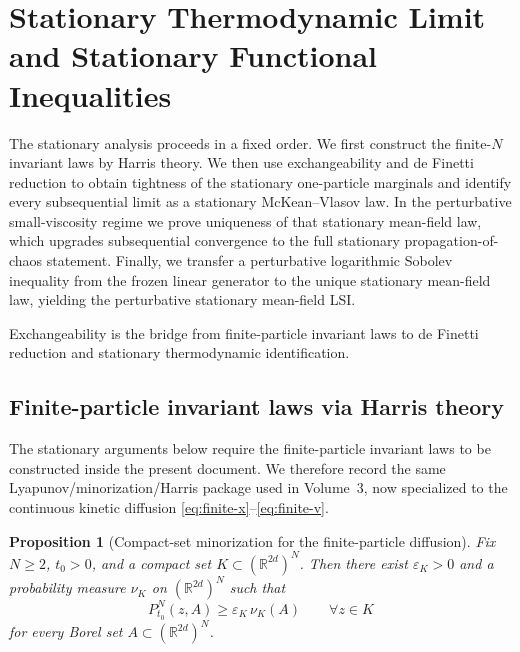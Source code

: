 \documentclass[11pt]{article}
\newtheorem{proposition}[theorem]{Proposition}
\theoremstyle{definition}
\theoremstyle{remark}
\newcommand{\R}{\mathbb{R}}
\begin{document}
\section{Stationary Thermodynamic Limit and Stationary Functional Inequalities}

The stationary analysis proceeds in a fixed order. We first construct the
finite-$N$ invariant laws by Harris theory. We then use exchangeability and
de Finetti reduction to obtain tightness of the stationary one-particle
marginals and identify every subsequential limit as a stationary
McKean--Vlasov law. In the perturbative small-viscosity regime we prove uniqueness of that
stationary mean-field law, which upgrades subsequential convergence to the full
stationary propagation-of-chaos statement. Finally, we transfer a perturbative
logarithmic Sobolev inequality from the frozen linear generator to the unique
stationary mean-field law, yielding the perturbative stationary mean-field LSI.

Exchangeability is the bridge from finite-particle invariant laws to de Finetti
reduction and stationary thermodynamic identification.

\subsection{Finite-particle invariant laws via Harris theory}

The stationary arguments below require the finite-particle invariant laws to be
constructed inside the present document. We therefore record the same
Lyapunov/minorization/Harris package used in Volume~3,
now specialized to the continuous kinetic diffusion
\eqref{eq:finite-x}--\eqref{eq:finite-v}.

\begin{proposition}[Compact-set minorization for the finite-particle diffusion]\label{prop:finite-minorization}
Fix \(N\geq2\), \(t_0>0\), and a compact set
\(K\subset(\R^{2d})^N\). Then there exist
\(\varepsilon_K>0\) and a probability measure \(\nu_K\) on \((\R^{2d})^N\) such
that
\[
P_{t_0}^N(z,A)\geq \varepsilon_K\,\nu_K(A)
\qquad
\forall z\in K
\]
for every Borel set \(A\subset(\R^{2d})^N\).
\end{proposition}
\end{document}

